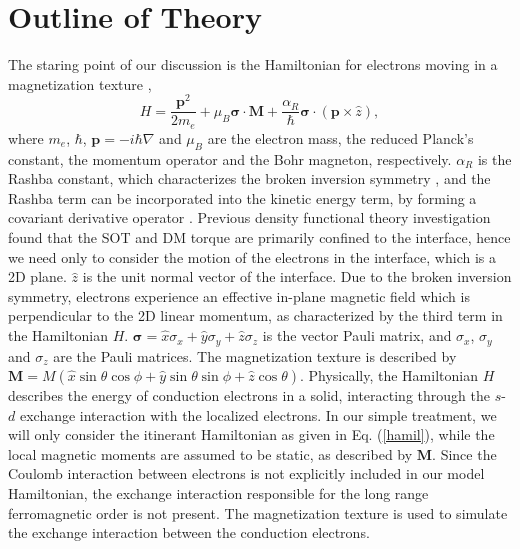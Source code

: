 \documentclass[12pt]{iopart}
\begin{document}
\section{Outline of Theory}
\label{theory}
The staring point of our discussion is the Hamiltonian for electrons moving in a magnetization texture \cite{Garate,Manchon,Matos-Abiague},
\begin{equation}
H = \frac{\textbf{p}^2}{2 m_e}  + \mu_B \bm{\sigma} \cdot \textbf{M} + \frac {\alpha_R} {\hbar} \bm{\sigma} \cdot (\textbf{p} \times \hat{z}),
\label{hamil}
\end{equation}
where $m_e$, $\hbar$, $\textbf{p}= -i \hbar \nabla$ and $\mu_B$ are the electron mass, the reduced Planck's constant, the momentum operator and the Bohr magneton, respectively. $\alpha_R$ is the Rashba constant, which characterizes the broken inversion symmetry \cite{Bychkov84}, and the Rashba term can be incorporated into the kinetic energy term, by forming a covariant derivative operator \cite{kim13}. Previous density functional theory investigation found that the SOT \cite{Freimuth13} and DM torque \cite{Yang15} are primarily confined to the interface, hence we need only to consider the motion of the electrons in the interface, which is a 2D plane. $\hat {z}$ is the unit normal vector of the interface. Due to the broken inversion symmetry, electrons experience an effective in-plane magnetic field which is perpendicular to the 2D linear momentum, as characterized by the third term in the Hamiltonian $H$. $\bm{\sigma} = \hat{x}\sigma_x + \hat{y}\sigma_y + \hat{z} \sigma_z$ is the vector Pauli matrix, and $\sigma_x$, $\sigma_y$ and $\sigma_z$ are the Pauli matrices. The magnetization texture is described by $\textbf{M} = M (\hat{x}\sin\theta \cos\phi + \hat{y}\sin\theta \sin\phi + \hat{z} \cos\theta)$. Physically, the Hamiltonian $H$ describes the energy of conduction electrons in a solid, interacting through the $s$-$d$ exchange interaction with the localized electrons. In our simple treatment, we will only consider the itinerant Hamiltonian as given in Eq. (\ref{hamil}), while the local magnetic moments are assumed to be static, as described by $\textbf{M}$. Since the Coulomb interaction between electrons is not explicitly included in our model Hamiltonian, the exchange interaction responsible for the long range ferromagnetic order is not present. The magnetization texture is used to simulate the exchange interaction between the conduction electrons.
\end{document}
